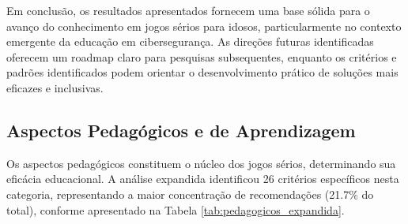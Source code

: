 \begin{table}[H]
Em conclusão, os resultados apresentados fornecem uma base sólida para o avanço do conhecimento em jogos sérios para idosos, particularmente no contexto emergente da educação em cibersegurança. As direções futuras identificadas oferecem um roadmap claro para pesquisas subsequentes, enquanto os critérios e padrões identificados podem orientar o desenvolvimento prático de soluções mais eficazes e inclusivas.


\subsection{Aspectos Pedagógicos e de Aprendizagem}
\label{subsec:pedagogicos_expandida}

Os aspectos pedagógicos constituem o núcleo dos jogos sérios, determinando sua eficácia educacional. A análise expandida identificou 26 critérios específicos nesta categoria, representando a maior concentração de recomendações (21.7\% do total), conforme apresentado na Tabela \ref{tab:pedagogicos_expandida}.


\end{table}
